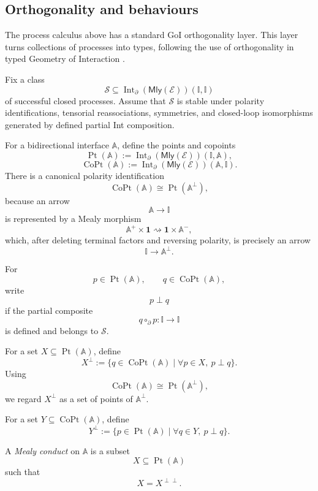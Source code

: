 \subsection{Orthogonality and behaviours}

The process calculus above has a standard GoI orthogonality layer.  This layer
turns collections of processes into types, following the use of orthogonality
in typed Geometry of Interaction
\cite{HaghverdiTypedGoI}.

Fix a class
\[
\mathcal S
\subseteq
\operatorname{Int}_{\partial}(\mathsf{Mly}(\mathcal E))(\mathbb I,\mathbb I)
\]
of successful closed processes.  Assume that \(\mathcal S\) is stable under
polarity identifications, tensorial reassociations, symmetries, and
closed-loop isomorphisms generated by defined partial Int composition.

For a bidirectional interface \(\mathbb A\), define the points and copoints
\[
\operatorname{Pt}(\mathbb A)
:=
\operatorname{Int}_{\partial}(\mathsf{Mly}(\mathcal E))(\mathbb I,\mathbb A),
\]
\[
\operatorname{CoPt}(\mathbb A)
:=
\operatorname{Int}_{\partial}(\mathsf{Mly}(\mathcal E))(\mathbb A,\mathbb I).
\]
There is a canonical polarity identification
\[
\operatorname{CoPt}(\mathbb A)
\cong
\operatorname{Pt}(\mathbb A^\bot),
\]
because an arrow
\[
\mathbb A\to\mathbb I
\]
is represented by a Mealy morphism
\[
\mathbb A^+\times\mathbf 1
\rightsquigarrow
\mathbf 1\times\mathbb A^-,
\]
which, after deleting terminal factors and reversing polarity, is precisely an
arrow
\[
\mathbb I\to\mathbb A^\bot.
\]

\begin{definition}
\label{def:trace-class-orthogonality}
For
\[
p\in\operatorname{Pt}(\mathbb A),
\qquad
q\in\operatorname{CoPt}(\mathbb A),
\]
write
\[
p\perp q
\]
if the partial composite
\[
q\circ_{\partial}p:\mathbb I\to\mathbb I
\]
is defined and belongs to \(\mathcal S\).
\end{definition}

For a set \(X\subseteq\operatorname{Pt}(\mathbb A)\), define
\[
X^\perp
:=
\{q\in\operatorname{CoPt}(\mathbb A)\mid
\forall p\in X,\ p\perp q\}.
\]
Using
\[
\operatorname{CoPt}(\mathbb A)
\cong
\operatorname{Pt}(\mathbb A^\bot),
\]
we regard \(X^\perp\) as a set of points of \(\mathbb A^\bot\).

For a set \(Y\subseteq\operatorname{CoPt}(\mathbb A)\), define
\[
Y^\perp
:=
\{p\in\operatorname{Pt}(\mathbb A)\mid
\forall q\in Y,\ p\perp q\}.
\]

\begin{definition}
\label{def:mealy-conduct}
A \emph{Mealy conduct} on \(\mathbb A\) is a subset
\[
X\subseteq\operatorname{Pt}(\mathbb A)
\]
such that
\[
X=X^{\perp\perp}.
\]
\end{definition}

